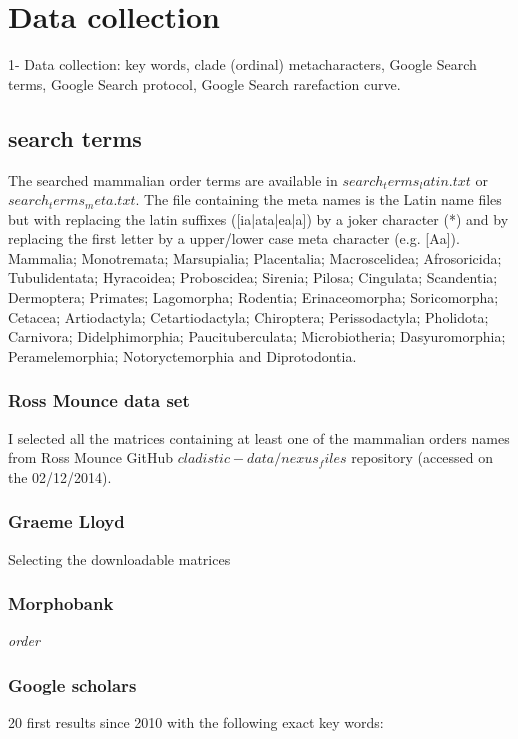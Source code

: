 

\bigskip

\section{Data collection}
1- Data collection: key words, clade (ordinal) metacharacters, Google Search terms, Google Search protocol, Google Search rarefaction curve.

\subsection{search terms}
The searched mammalian order terms are available in $search_terms_latin.txt$ or $search_terms_meta.txt$. The file containing the meta names is the Latin name files but with replacing the latin suffixes ([ia|ata|ea|a]) by a joker character (*) and by replacing the first letter by a upper/lower case meta character (e.g. [Aa]).
Mammalia; Monotremata; Marsupialia; Placentalia; Macroscelidea; Afrosoricida; Tubulidentata; Hyracoidea; Proboscidea; Sirenia; Pilosa; Cingulata; Scandentia; Dermoptera; Primates; Lagomorpha; Rodentia; Erinaceomorpha; Soricomorpha; Cetacea; Artiodactyla; Cetartiodactyla; Chiroptera; Perissodactyla; Pholidota; Carnivora; Didelphimorphia; Paucituberculata; Microbiotheria; Dasyuromorphia; Peramelemorphia; Notoryctemorphia and Diprotodontia.

\subsubsection{Ross Mounce data set}
I selected all the matrices containing at least one of the mammalian orders names from Ross Mounce GitHub $cladistic-data/nexus_files$ repository (accessed on the 02/12/2014).

\subsubsection{Graeme Lloyd}
Selecting the downloadable matrices

\subsubsection{Morphobank}
\textit{order}

\subsubsection{Google scholars}
20 first results since 2010 with the following exact key words:

